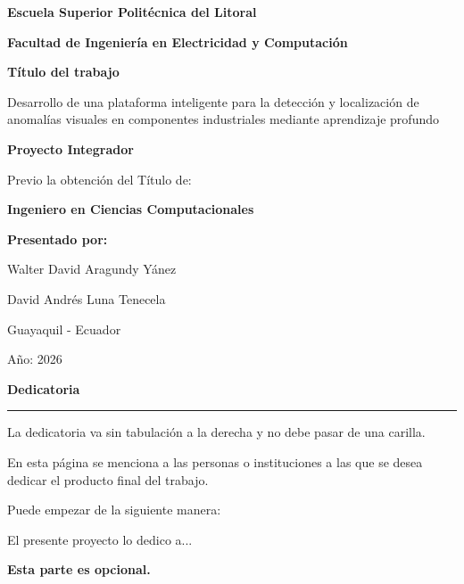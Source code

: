 \documentclass[12pt,oneside]{report}
\newcommand{\encabezadolinea}[1]{%
  {\centering\bfseries #1\par}\vspace{-0.6\baselineskip}\noindent\rule{\textwidth}{0.6pt}\par}
\begin{document}
\RaggedRight

\pagestyle{empty}
\begin{center}
\onehalfspacing
\vspace*{1.5cm}
{\bfseries Escuela Superior Politécnica del Litoral\par}
\vspace{0.8cm}
{\bfseries Facultad de Ingeniería en Electricidad y Computación\par}
\vspace{1.2cm}
{\bfseries Título del trabajo\par}
Desarrollo de una plataforma inteligente para la detección y localización de anomalías visuales en componentes industriales mediante aprendizaje profundo\par
\vspace{0.4cm}
{\bfseries Proyecto Integrador\par}
\vspace{0.4cm}
Previo la obtención del Título de:\par
\vspace{0.4cm}
{\bfseries Ingeniero en Ciencias Computacionales\par}
\vspace{1.5cm}
{\bfseries Presentado por:\par}
Walter David Aragundy Yánez\par
David Andrés Luna Tenecela\par
\vspace{1.5cm}
Guayaquil - Ecuador\par
Año: 2026\par
\end{center}

\clearpage
\encabezadolinea{Dedicatoria}
\vspace*{\fill}
\hfill
\begin{minipage}{0.45\textwidth}
\RaggedRight\setlength{\parindent}{0pt}\setlength{\parskip}{6pt}
La dedicatoria va sin tabulación a la derecha y no debe pasar de una carilla.

En esta página se menciona a las personas o instituciones a las que se desea dedicar el producto final del trabajo.

Puede empezar de la siguiente manera:

El presente proyecto lo dedico a...

\textbf{Esta parte es opcional.}
\end{minipage}
\vspace*{\fill}
\end{document}
